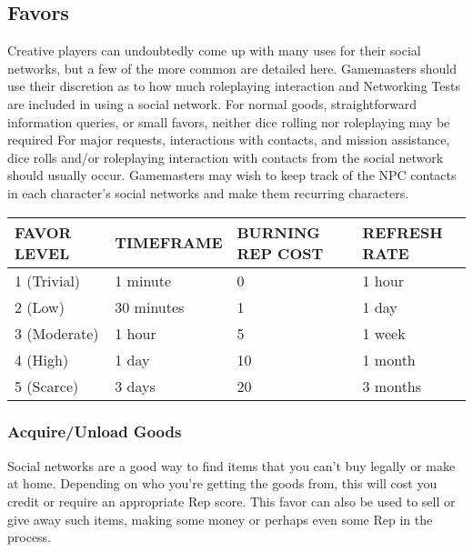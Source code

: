 \subsection{Favors} 

Creative players can undoubtedly come up with many uses for their social networks, but a few of the more common are detailed here. Gamemasters should use their discretion as to how much roleplaying interaction and Networking Tests are included in using a social network. For normal goods, straightforward information queries, or small favors, neither dice rolling nor roleplaying may be required For major requests, interactions with contacts, and mission assistance, dice rolls and/or roleplaying interaction with contacts from the social network should usually occur. Gamemasters may wish to keep track of the NPC contacts in each character's social networks and make them recurring characters. 

\begin{table}  \begin{tabular}{|l|l|l|l|} \hline

FAVOR LEVEL &TIMEFRAME &BURNING REP COST &REFRESH RATE \\ \hline

1 (Trivial) &1 minute &0 &1 hour \\ \hline

2 (Low) &30 minutes &1 &1 day \\ \hline

3 (Moderate) &1 hour &5 &1 week \\ \hline

4 (High) &1 day &10 &1 month \\ \hline

5 (Scarce) &3 days &20 &3 months \\ \hline

\end{tabular} \end{table} 



\subsubsection{Acquire/Unload Goods} 

Social networks are a good way to find items that you can't buy legally or make at home. Depending on who you're getting the goods from, this will cost you credit or require an appropriate Rep score. This favor can also be used to sell or give away such items, making some money or perhaps even some Rep in the process. 

